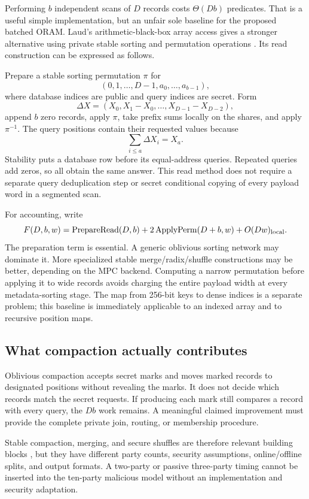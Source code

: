 \documentclass[11pt]{article}
\begin{document}
Performing $b$ independent scans of $D$ records costs $\Theta(Db)$ predicates.
That is a useful simple implementation, but an unfair sole baseline for the
proposed batched ORAM. Laud's arithmetic-black-box array access gives a stronger
alternative using private stable sorting and permutation operations
\cite{laud2015}. Its read construction can be expressed as follows.

Prepare a stable sorting permutation $\pi$ for
\[
(0,1,\ldots,D-1,a_0,\ldots,a_{b-1}),
\]
where database indices are public and query indices are secret. Form
\[
\Delta X=(X_0,X_1-X_0,\ldots,X_{D-1}-X_{D-2}),
\]
append $b$ zero records, apply $\pi$, take prefix sums locally on the shares,
and apply $\pi^{-1}$. The query positions contain their requested values because
\[
\sum_{i\leq a}\Delta X_i=X_a.
\]
Stability puts a database row before its equal-address queries. Repeated queries
add zeros, so all obtain the same answer. This read method does not require a
separate query deduplication step or secret conditional copying of every
payload word in a segmented scan.

For accounting, write
\begin{equation}
F(D,b,w)=\operatorname{PrepareRead}(D,b)
+2\operatorname{ApplyPerm}(D+b,w)+O(Dw)_{\rm local}.
\label{eq:direct}
\end{equation}
The preparation term is essential. A generic oblivious sorting network may
dominate it. More specialized stable merge/radix/shuffle constructions may be
better, depending on the MPC backend. Computing a narrow permutation before
applying it to wide records avoids charging the entire payload width at every
metadata-sorting stage. The map from 256-bit keys to dense indices is a separate
problem; this baseline is immediately applicable to an indexed array and to
recursive position maps.

\subsection{What compaction actually contributes}

Oblivious compaction accepts secret marks and moves marked records to designated
positions without revealing the marks. It does not decide which records match
the secret requests. If producing each mark still compares a record with every
query, the $Db$ work remains. A meaningful claimed improvement must provide the
complete private join, routing, or membership procedure.

Stable compaction, merging, and secure shuffles are therefore relevant building
blocks \cite{falk2021,blunk2025,logstar,shuffle2024}, but they have different
party counts, security assumptions, online/offline splits, and output formats.
A two-party or passive three-party timing cannot be inserted into the ten-party
malicious model without an implementation and security adaptation.
\end{document}

